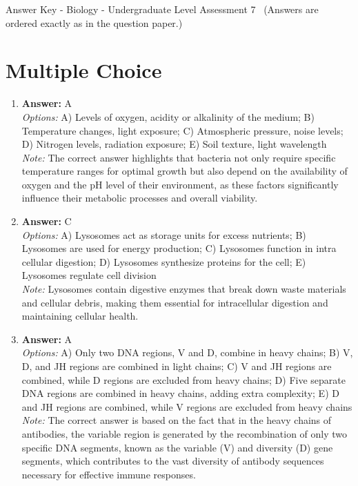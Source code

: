 \documentclass[12pt]{article}
\begin{document}
\begin{center}
Answer Key - Biology - Undergraduate Level Assessment 7 \
\small (Answers are ordered exactly as in the question paper.)
\end{center}

\section*{Multiple Choice}
\begin{enumerate}[label=\arabic*.]
\item \textbf{Answer:} A
\\ \textit{Options:} A) Levels of oxygen, acidity or alkalinity of the medium; B) Temperature changes, light exposure; C) Atmospheric pressure, noise levels; D) Nitrogen levels, radiation exposure; E) Soil texture, light wavelength
\\ \textit{Note:} The correct answer highlights that bacteria not only require specific temperature ranges for optimal growth but also depend on the availability of oxygen and the pH level of their environment, as these factors significantly influence their metabolic processes and overall viability.
\item \textbf{Answer:} C
\\ \textit{Options:} A) Lysosomes act as storage units for excess nutrients; B) Lysosomes are used for energy production; C) Lysosomes function in intra cellular digestion; D) Lysosomes synthesize proteins for the cell; E) Lysosomes regulate cell division
\\ \textit{Note:} Lysosomes contain digestive enzymes that break down waste materials and cellular debris, making them essential for intracellular digestion and maintaining cellular health.
\item \textbf{Answer:} A
\\ \textit{Options:} A) Only two DNA regions, V and D, combine in heavy chains; B) V, D, and JH regions are combined in light chains; C) V and JH regions are combined, while D regions are excluded from heavy chains; D) Five separate DNA regions are combined in heavy chains, adding extra complexity; E) D and JH regions are combined, while V regions are excluded from heavy chains
\\ \textit{Note:} The correct answer is based on the fact that in the heavy chains of antibodies, the variable region is generated by the recombination of only two specific DNA segments, known as the variable (V) and diversity (D) gene segments, which contributes to the vast diversity of antibody sequences necessary for effective immune responses.

\end{enumerate}
\end{document}
